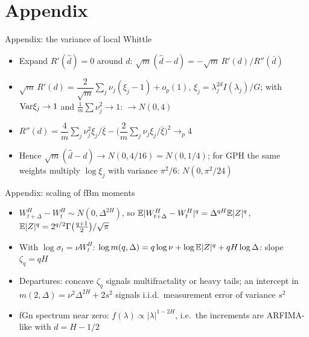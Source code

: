 \section{Appendix}

\begin{frame}{Appendix: the variance of local Whittle}
\hypertarget{atsapp1}{}
\itemsize{\small}
\begin{itemize}
    \item Expand $R'(\hat d) = 0$ around $d$: $\sqrt m(\hat d - d) = -\sqrt m\,R'(d)/R''(\bar d)$
    \item $\sqrt m\,R'(d) = \dfrac{2}{\sqrt m}\sum_j\nu_j(\xi_j - 1) + o_p(1)$, $\xi_j = \lambda_j^{2d}I(\lambda_j)/G$; with $\text{Var}\xi_j \to 1$ and $\frac1m\sum\nu_j^2 \to 1$: $\to N(0, 4)$
    \item $R''(d) = \dfrac4m\sum_j\nu_j^2\xi_j/\bar\xi - \big(\dfrac2m\sum_j\nu_j\xi_j/\bar\xi\big)^2 \to_p 4$
    \item Hence $\sqrt m(\hat d - d) \to N(0, 4/16) = N(0, 1/4)$; for GPH the same weights multiply $\log\xi_j$ with variance $\pi^2/6$: $N(0, \pi^2/24)$
\end{itemize}
\end{frame}

\begin{frame}{Appendix: scaling of fBm moments}
\hypertarget{atsapp2}{}
\itemsize{\small}
\begin{itemize}
    \item $W^H_{t+\Delta} - W^H_t \sim N(0, \Delta^{2H})$, so $\mathbb{E}|W^H_{t+\Delta} - W^H_t|^q = \Delta^{qH}\mathbb{E}|Z|^q$, $\mathbb{E}|Z|^q = 2^{q/2}\Gamma\big(\tfrac{q+1}{2}\big)/\sqrt\pi$
    \item With $\log\sigma_t = \nu W^H_t$: $\log m(q, \Delta) = q\log\nu + \log\mathbb{E}|Z|^q + qH\log\Delta$: slope $\zeta_q = qH$
    \item Departures: concave $\zeta_q$ signals multifractality or heavy tails; an intercept in $m(2, \Delta) = \nu^2\Delta^{2H} + 2s^2$ signals i.i.d.\ measurement error of variance $s^2$
    \item fGn spectrum near zero: $f(\lambda) \propto |\lambda|^{1-2H}$, i.e.\ the increments are ARFIMA-like with $d = H - 1/2$
\end{itemize}
\end{frame}


